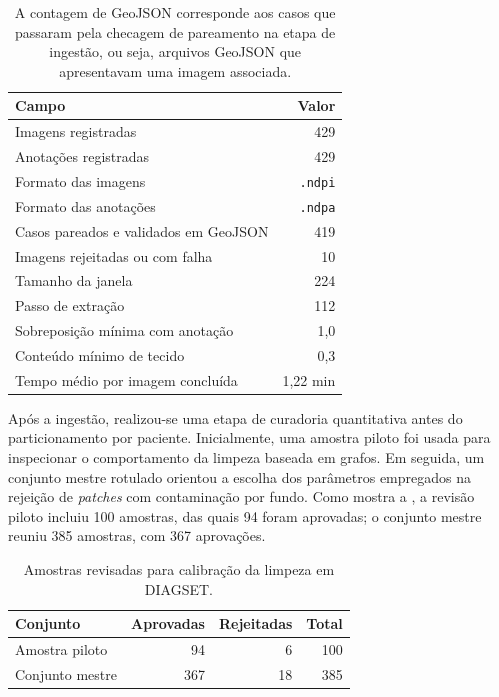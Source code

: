 \begin{table}[!htb]
\centering
\caption{Ingestão e extração inicial de DIAGSET antes da geração de \textit{patches}.}
\label{tab:results_diagset-stage2-ingestion}
\small
\begin{tabular}{lr}
\toprule
Campo & Valor \\
\midrule
Imagens registradas & 429 \\
Anotações registradas & 429 \\
Formato das imagens & \texttt{.ndpi} \\
Formato das anotações & \texttt{.ndpa} \\
Casos pareados e validados em GeoJSON & 419 \\
Imagens rejeitadas ou com falha & 10 \\
Tamanho da janela & 224 \\
Passo de extração & 112 \\
Sobreposição mínima com anotação & 1{,}0 \\
Conteúdo mínimo de tecido & 0{,}3 \\
Tempo médio por imagem concluída & 1{,}22 min \\
\bottomrule
\end{tabular}
\caption*{\footnotesize A contagem de GeoJSON corresponde aos casos que passaram pela checagem de pareamento na etapa de ingestão, ou seja, arquivos GeoJSON que apresentavam uma imagem associada.}
\end{table}

Após a ingestão, realizou-se uma etapa de curadoria quantitativa antes do particionamento por paciente. Inicialmente, uma amostra piloto foi usada para inspecionar o comportamento da limpeza baseada em grafos. Em seguida, um conjunto mestre rotulado orientou a escolha dos parâmetros empregados na rejeição de \textit{patches} com contaminação por fundo. Como mostra a , a revisão piloto incluiu 100 amostras, das quais 94 foram aprovadas; o conjunto mestre reuniu 385 amostras, com 367 aprovações.

\begin{table}[!htb]
\centering
\caption{Amostras revisadas para calibração da limpeza em DIAGSET.}
\label{tab:results_diagset-stage3-sampling}
\small
\begin{tabular}{lrrr}
\toprule
Conjunto & Aprovadas & Rejeitadas & Total \\
\midrule
Amostra piloto & 94 & 6 & 100 \\
Conjunto mestre & 367 & 18 & 385 \\
\bottomrule
\end{tabular}
\end{table}

